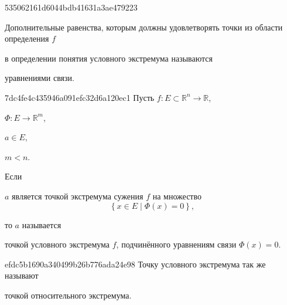 \begin{note}{535062161d6044bdb41631a3ae479223}
    \begin{icloze}{2}Дополнительные равенства, которым должны удовлетворять точки из области определения \({ f }\)\end{icloze} в определении понятия условного экстремума называются \begin{icloze}{1}уравнениями связи.\end{icloze}
\end{note}

\begin{note}{7dc4fe4c435946a091efc32d6a120ec1}
    Пусть \({ f : E \subset \mathbb R^{n} \to \mathbb R }\), \begin{icloze}{4}\({ \Phi : E \to \mathbb R^{m} }\),\end{icloze} \({ a \in E }\), \begin{icloze}{3}\({ m < n }\).\end{icloze}
    Если
    \begin{icloze}{1}
        \({ a }\) является точкой экстремума сужения \({ f }\) на множество
        \[
            \left\{ x \in E \mid \Phi(x) = 0 \right\},
        \]
    \end{icloze}
    то \({ a }\) называется \begin{icloze}{2}точкой условного экстремума \({ f }\), подчинённого уравнениям связи \({ \Phi(x) = 0 }\).\end{icloze}
\end{note}

\begin{note}{efdc5b1690a340499b26b776ada24e98}
    Точку условного экстремума так же называют \begin{icloze}{1}точкой относительного экстремума.\end{icloze}
\end{note}

